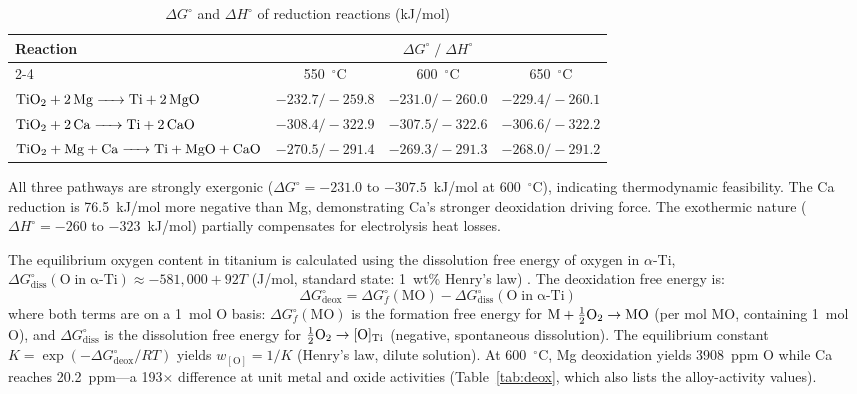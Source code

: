 \documentclass[pdflatex,sn-basic,Numbered]{sn-jnl}
\begin{document}
\begin{table}[!ht]
\centering
\footnotesize
\caption{$\Delta G^{\circ}$ and $\Delta H^{\circ}$ of reduction reactions (kJ/mol)}
\label{tab:thermo}
\begin{tabular}{lccc}
\toprule
\multirow{2}{*}{Reaction} & \multicolumn{3}{c}{$\Delta G^{\circ}\;/\;\Delta H^{\circ}$} \\
\cmidrule(lr){2-4}
 & 550~$^{\circ}$C & 600~$^{\circ}$C & 650~$^{\circ}$C \\
\midrule
$\ce{TiO2 + 2Mg -> Ti + 2MgO}$ & $-232.7/-259.8$ & $-231.0/-260.0$ & $-229.4/-260.1$ \\
$\ce{TiO2 + 2Ca -> Ti + 2CaO}$ & $-308.4/-322.9$ & $-307.5/-322.6$ & $-306.6/-322.2$ \\
$\ce{TiO2 + Mg + Ca -> Ti + MgO + CaO}$ & $-270.5/-291.4$ & $-269.3/-291.3$ & $-268.0/-291.2$ \\
\bottomrule
\end{tabular}
\end{table}

All three pathways are strongly exergonic ($\Delta G^{\circ} = -231.0$ to $-307.5$~kJ/mol at 600~$^{\circ}$C), indicating thermodynamic feasibility. The Ca reduction is 76.5~kJ/mol more negative than Mg, demonstrating Ca's stronger deoxidation driving force. The exothermic nature ($\Delta H^{\circ} = -260$ to $-323$~kJ/mol) partially compensates for electrolysis heat losses.

The equilibrium oxygen content in titanium is calculated using the dissolution free energy of oxygen in $\alpha$-Ti, $\Delta G^{\circ}_{\mathrm{diss}}(\mathrm{O\;in\;\alpha\text{-}Ti}) \approx -581{,}000 + 92T$ (J/mol, standard state: 1~wt\% Henry's law) \cite{waldner1999}. The deoxidation free energy is:
\begin{equation}
\label{eq:deox}
\Delta G^{\circ}_{\mathrm{deox}} = \Delta G^{\circ}_{f}(\mathrm{MO}) - \Delta G^{\circ}_{\mathrm{diss}}(\mathrm{O\;in\;\alpha\text{-}Ti})
\end{equation}
where both terms are on a 1~mol O basis: $\Delta G^{\circ}_{f}(\mathrm{MO})$ is the formation free energy for $\mathrm{M} + \tfrac{1}{2}\ce{O2} \to \mathrm{MO}$ (per mol MO, containing 1~mol O), and $\Delta G^{\circ}_{\mathrm{diss}}$ is the dissolution free energy for $\tfrac{1}{2}\ce{O2} \to [\mathrm{O}]_{\mathrm{Ti}}$ (negative, spontaneous dissolution).
The equilibrium constant $K = \exp(-\Delta G^{\circ}_{\mathrm{deox}}/RT)$ yields $w_{[\mathrm{O}]} = 1/K$ (Henry's law, dilute solution). At 600~$^{\circ}$C, Mg deoxidation yields 3908~ppm O while Ca reaches 20.2~ppm---a 193$\times$ difference at unit metal and oxide activities (Table~\ref{tab:deox}, which also lists the alloy-activity values).
\end{document}
